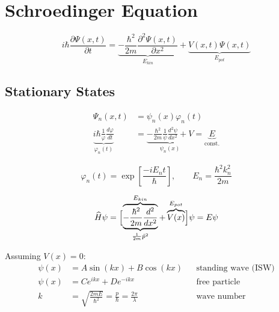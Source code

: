 \newcol{}
\section{Schroedinger Equation}
\noindent\begin{equation*}
    i\hbar \frac{\partial \Psi(x,t)}{\partial t}           = \underbrace{- \frac{\hbar^2}{2m} \frac{\partial^2 \Psi(x,t)}{\partial x^2}}_{E_{kin}} + \underbrace{V(x,t)\Psi(x,t)}_{E_{pot}}
\end{equation*}

\subsection{Stationary States}
\noindent\begin{align*}
    \Psi_n(x,t)                                                        & = \psi_n(x)\varphi_n(t)                                                                                         \\
    \underbrace{i\hbar\frac1\varphi\frac{d\varphi}{dt}}_{\varphi_n(t)} & =\underbrace{-\frac{\hbar^2}{2m}\frac1\psi\frac{d^2\psi}{dx^2}+V}_{\psi_n (x)} = \underbrace{E}_{\text{const.}}
\end{align*}

\noindent\begin{equation*}
    \varphi_n(t) =\exp\left[\frac{-iE_n t}{\hbar}\right], \qquad E_n = \frac{\hbar^2 k_n^2}{2m}
\end{equation*}

\noindent\begin{equation*}
    \widehat{H}\psi  = \Bigl[\overbrace{\underbrace{-\frac{\hbar^2}{2m}\frac{d^2}{dx^2}}_{\frac{1}{2m}\hat{p}^2}}^{E_{kin}}+ \overbrace{V(x)}^{E_{pot}}\Bigr]\psi = E\psi
\end{equation*}

\newpar{}
Assuming $V(x) = 0$:
\noindent\begin{align*}
    \psi(x) & =A\sin(kx)+B\cos(kx)                                               &  & \text{standing wave (ISW)} \\
    \psi(x) & =Ce^{ikx}+De^{-ikx}                                                &  & \text{free particle}       \\
    k       & =\sqrt{\frac{2mE}{\hbar^{2}}}=\frac{p}{\hbar}=\frac{2\pi}{\lambda} &  & \text{wave number}
\end{align*}


